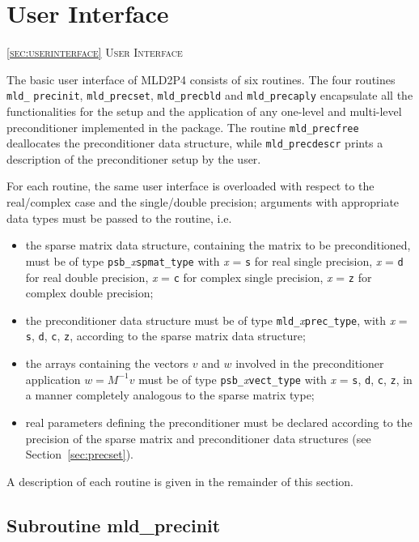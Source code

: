 \section{User Interface\label{sec:userinterface}}
         {\textsc{\ref{sec:userinterface} User Interface}}


The basic user interface of MLD2P4 consists of six routines. The four
routines \verb|mld_| \verb|precinit|, \verb|mld_precset|,
\verb|mld_precbld| and \verb|mld_precaply| encapsulate all the
functionalities for the setup and the application of any one-level and
multi-level preconditioner implemented in the package. 
The routine \verb|mld_precfree| deallocates the preconditioner data structure, while
\verb|mld_precdescr| prints a description of the preconditioner setup by the user.

For each routine, the same user interface is overloaded with
respect to the real/complex case and the single/double precision;
arguments with appropriate data types must be passed to the routine,
i.e.
\begin{itemize}
\item the sparse matrix data structure, containing the matrix to be
  preconditioned, must be of type \verb|psb_|\emph{x}\verb|spmat_type|
	with \emph{x} = \verb|s| for real single precision, \emph{x} = \verb|d|
	for real double precision, \emph{x} = \verb|c| for complex single precision,
	\emph{x} = \verb|z| for complex double precision;
\item the preconditioner data structure must be of type
  \verb|mld_|\emph{x}\verb|prec_type|, with \emph{x} =    
  \verb|s|, \verb|d|, \verb|c|, \verb|z|, according to the sparse
  matrix data structure;
\item the arrays containing the vectors $v$ and $w$ involved in
  the preconditioner application $w=M^{-1}v$ must be of type   
  \verb|psb_|\emph{x}\verb|vect_type| with \emph{x} =    
  \verb|s|, \verb|d|, \verb|c|, \verb|z|, in a manner completely
  analogous to the sparse matrix type;
\item real parameters defining the preconditioner must be declared
  according to the precision of the sparse matrix and preconditioner
  data structures (see Section~\ref{sec:precset}).
\end{itemize}
A description of each routine is given in the remainder of this section.

\clearpage

\subsection{Subroutine mld\_precinit\label{sec:precinit}}

